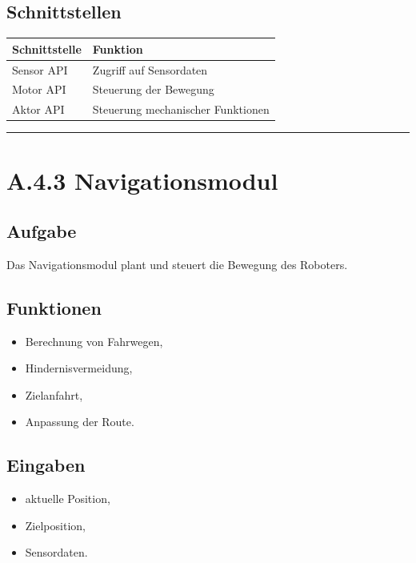 \documentclass[
]{article}
\providecommand{\tightlist}{%
  \setlength{\itemsep}{0pt}\setlength{\parskip}{0pt}}
\begin{document}
\subsection{Schnittstellen}\label{schnittstellen}

\begin{longtable}[]{@{}ll@{}}
\toprule\noalign{}
Schnittstelle & Funktion \\
\midrule\noalign{}
\endhead
\bottomrule\noalign{}
\endlastfoot
Sensor API & Zugriff auf Sensordaten \\
Motor API & Steuerung der Bewegung \\
Aktor API & Steuerung mechanischer Funktionen \\
\end{longtable}

\begin{center}\rule{0.5\linewidth}{0.5pt}\end{center}

\section{A.4.3 Navigationsmodul}\label{a.4.3-navigationsmodul}

\subsection{Aufgabe}\label{aufgabe-7}

Das Navigationsmodul plant und steuert die Bewegung des Roboters.

\subsection{Funktionen}\label{funktionen-1}

\begin{itemize}
\tightlist
\item
  Berechnung von Fahrwegen,
\item
  Hindernisvermeidung,
\item
  Zielanfahrt,
\item
  Anpassung der Route.
\end{itemize}

\subsection{Eingaben}\label{eingaben}

\begin{itemize}
\tightlist
\item
  aktuelle Position,
\item
  Zielposition,
\item
  Sensordaten.
\end{itemize}
\end{document}
